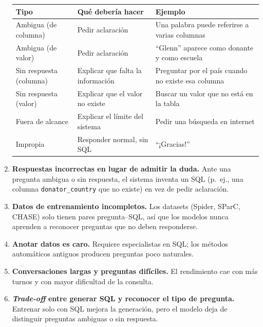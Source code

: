 \documentclass[11pt,a4paper]{article}
\begin{document}
\begin{enumerate}
  \begin{center}
  \small
  \begin{tabularx}{\linewidth}{@{}l X X@{}}
    \toprule
    \textbf{Tipo} & \textbf{Qué debería hacer} & \textbf{Ejemplo} \\
    \midrule
    Ambigua (de columna) & Pedir aclaración & Una palabra puede referirse a varias columnas \\
    Ambigua (de valor) & Pedir aclaración & ``Glenn'' aparece como donante y como escuela \\
    Sin respuesta (columna) & Explicar que falta la información & Preguntar por el país cuando no existe esa columna \\
    Sin respuesta (valor) & Explicar que el valor no existe & Buscar un valor que no está en la tabla \\
    Fuera de alcance & Explicar el límite del sistema & Pedir una búsqueda en internet \\
    Impropia & Responder normal, sin SQL & ``¡Gracias!'' \\
    \bottomrule
  \end{tabularx}
  \end{center}
  \item \textbf{Respuestas incorrectas en lugar de admitir la duda.} Ante una pregunta ambigua o sin respuesta, el sistema inventa un SQL (p.\ ej., una columna \texttt{donator\_country} que no existe) en vez de pedir aclaración.
  \item \textbf{Datos de entrenamiento incompletos.} Los datasets (Spider, SParC, CHASE) solo tienen pares pregunta--SQL, así que los modelos nunca aprenden a reconocer preguntas que no deben responderse.
  \item \textbf{Anotar datos es caro.} Requiere especialistas en SQL; los métodos automáticos antiguos producen preguntas poco naturales.
  \item \textbf{Conversaciones largas y preguntas difíciles.} El rendimiento cae con más turnos y con mayor dificultad de la consulta.
  \item \textbf{\textit{Trade-off} entre generar SQL y reconocer el tipo de pregunta.} Entrenar solo con SQL mejora la generación, pero el modelo deja de distinguir preguntas ambiguas o sin respuesta.
\end{enumerate}

\end{document}
